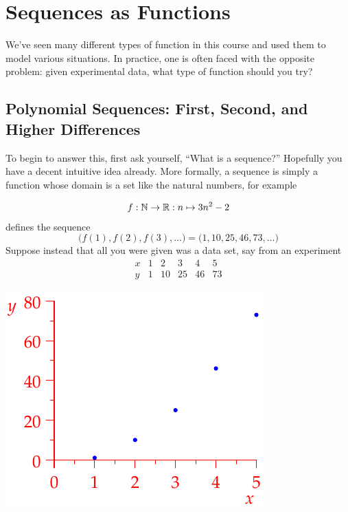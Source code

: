 \graphicspath{{4seq/asy/}}

\section{Sequences as Functions}

We've seen many different types of function in this course and used them to model various situations. In practice, one is often faced with the opposite problem: given experimental data, what type of function should you try?

\subsection{Polynomial Sequences: First, Second, and Higher Differences}

To begin to answer this, first ask yourself, ``What is a sequence?'' Hopefully you have a decent intuitive idea already. More formally, a sequence is simply a function whose domain is a set like the natural numbers, for example\par
\begin{minipage}[t]{0.6\linewidth}\vspace{-8pt}
\[f:\mathbb{N}\to\mathbb{R}:n\mapsto 3n^2-2\]
defines the sequence
\[\bigl(f(1),f(2),f(3),\ldots\bigr)=\bigl(1,10,25,46,73,\ldots\bigr)\]
Suppose instead that all you were given was a data set, say from an experiment
\[\begin{array}{c|ccccc}
x&1&2&3&4&5\\\hline
y&1&10&25&46&73
\end{array}\]
\end{minipage}\hfill\begin{minipage}[t]{0.39\linewidth}\vspace{-10pt}
\flushright\includegraphics{seqquadex}
\end{minipage}
\bigbreak

